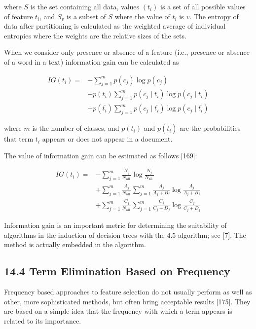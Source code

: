 \documentclass[10pt]{book}
\begin{document}
where $S$ is the set containing all data, values $\left(t_{i}\right)$ is a set of all possible values of feature $t_{i}$, and $S_{v}$ is a subset of $S$ where the value of $t_{i}$ is $v$. The entropy of data after partitioning is calculated as the weighted average of individual entropies where the weights are the relative sizes of the sets.

When we consider only presence or absence of a feature (i.e., presence or absence of a word in a text) information gain can be calculated as


\begin{align*}
I G\left(t_{i}\right)= & -\sum_{j=1}^{m} p\left(c_{j}\right) \log p\left(c_{j}\right) \\
& +p\left(t_{i}\right) \sum_{j=1}^{m} p\left(c_{j} \mid t_{i}\right) \log p\left(c_{j} \mid t_{i}\right)  \tag{14.19}\\
& +p\left(\overline{t_{i}}\right) \sum_{j=1}^{m} p\left(c_{j} \mid \overline{t_{i}}\right) \log p\left(c_{j} \mid \overline{t_{i}}\right)
\end{align*}


where $m$ is the number of classes, and $p\left(t_{i}\right)$ and $p\left(\bar{t}_{i}\right)$ are the probabilities that term $t_{i}$ appears or does not appear in a document.

The value of information gain can be estimated as follows [169]:


\begin{align*}
I G\left(t_{i}\right)= & -\sum_{j=1}^{m} \frac{N_{j}}{N_{\text {all }}} \log \frac{N_{j}}{N_{\text {all }}} \\
& +\sum_{j=1}^{m} \frac{A_{j}}{N_{\text {all }}} \sum_{j=1}^{m} \frac{A_{j}}{A_{j}+B_{j}} \log \frac{A_{j}}{A_{j}+B_{j}}  \tag{14.20}\\
& +\sum_{j=1}^{m} \frac{C_{j}}{N_{\text {all }}} \sum_{j=1}^{m} \frac{C_{j}}{C_{j}+D_{j}} \log \frac{C_{j}}{C_{j}+D_{j}}
\end{align*}


Information gain is an important metric for determining the suitability of algorithms in the induction of decision trees with the 4.5 algorithm; see [7]. The method is actually embedded in the algorithm.

\subsection*{14.4 Term Elimination Based on Frequency}
Frequency based approaches to feature selection do not usually perform as well as other, more sophisticated methods, but often bring acceptable results [175]. They are based on a simple idea that the frequency with which a term appears is related to its importance.
\end{document}
